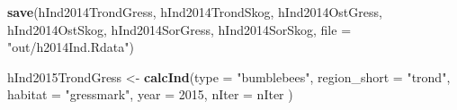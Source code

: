 \documentclass[]{article}
\newenvironment{Shaded}{\begin{snugshade}}{\end{snugshade}}
\newcommand{\KeywordTok}[1]{\textcolor[rgb]{0.13,0.29,0.53}{\textbf{#1}}}
\newcommand{\DataTypeTok}[1]{\textcolor[rgb]{0.13,0.29,0.53}{#1}}
\newcommand{\DecValTok}[1]{\textcolor[rgb]{0.00,0.00,0.81}{#1}}
\newcommand{\StringTok}[1]{\textcolor[rgb]{0.31,0.60,0.02}{#1}}
\newcommand{\NormalTok}[1]{#1}
\begin{document}
\begin{Shaded}
\begin{Highlighting}[]
\KeywordTok{save}\NormalTok{(hInd2014TrondGress, hInd2014TrondSkog, hInd2014OstGress, hInd2014OstSkog, hInd2014SorGress, hInd2014SorSkog, }\DataTypeTok{file =} \StringTok{"out/h2014Ind.Rdata"}\NormalTok{)}
\end{Highlighting}
\end{Shaded}

\begin{Shaded}
\begin{Highlighting}[]
\NormalTok{hInd2015TrondGress <-}\StringTok{ }\KeywordTok{calcInd}\NormalTok{(}\DataTypeTok{type =} \StringTok{"bumblebees"}\NormalTok{,}
                              \DataTypeTok{region_short =} \StringTok{"trond"}\NormalTok{,}
                              \DataTypeTok{habitat =} \StringTok{"gressmark"}\NormalTok{,}
                              \DataTypeTok{year =} \DecValTok{2015}\NormalTok{,}
                              \DataTypeTok{nIter =}\NormalTok{ nIter}
\NormalTok{                              )}
       

\end{Highlighting}
\end{Shaded}
\end{document}
